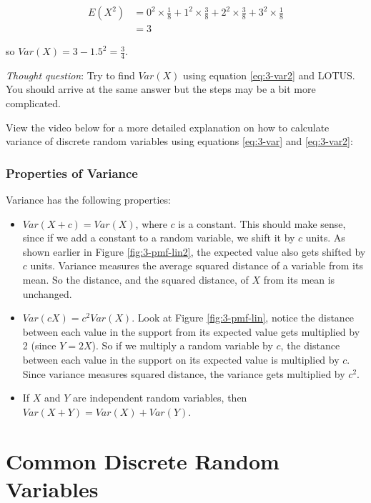\documentclass[
]{book}
\providecommand{\tightlist}{%
  \setlength{\itemsep}{0pt}\setlength{\parskip}{0pt}}
\begin{document}
\[
\begin{split}
E(X^2) &= 0^2 \times \frac{1}{8} + 1^2 \times \frac{3}{8} + 2^2 \times \frac{3}{8} + 3^2 \times \frac{1}{8} \\
       &= 3
\end{split}
\]

so \(Var(X) = 3 - 1.5^2 = \frac{3}{4}\).

\emph{Thought question}: Try to find \(Var(X)\) using equation \eqref{eq:3-var2} and LOTUS. You should arrive at the same answer but the steps may be a bit more complicated.

View the video below for a more detailed explanation on how to calculate variance of discrete random variables using equations \eqref{eq:3-var} and \eqref{eq:3-var2}:

\hypertarget{var-prop}{%
\subsubsection{Properties of Variance}\label{var-prop}}

Variance has the following properties:

\begin{itemize}
\tightlist
\item
  \(Var(X+c) = Var(X)\), where \(c\) is a constant. This should make sense, since if we add a constant to a random variable, we shift it by \(c\) units. As shown earlier in Figure \ref{fig:3-pmf-lin2}, the expected value also gets shifted by \(c\) units. Variance measures the average squared distance of a variable from its mean. So the distance, and the squared distance, of \(X\) from its mean is unchanged.
\item
  \(Var(cX) = c^2 Var(X)\). Look at Figure \ref{fig:3-pmf-lin}, notice the distance between each value in the support from its expected value gets multiplied by 2 (since \(Y=2X\)). So if we multiply a random variable by \(c\), the distance between each value in the support on its expected value is multiplied by \(c\). Since variance measures squared distance, the variance gets multiplied by \(c^2\).
\item
  If \(X\) and \(Y\) are independent random variables, then \(Var(X+Y) = Var(X) + Var(Y)\).
\end{itemize}

\hypertarget{commonDisRVs}{%
\section{Common Discrete Random Variables}\label{commonDisRVs}}
\end{document}
